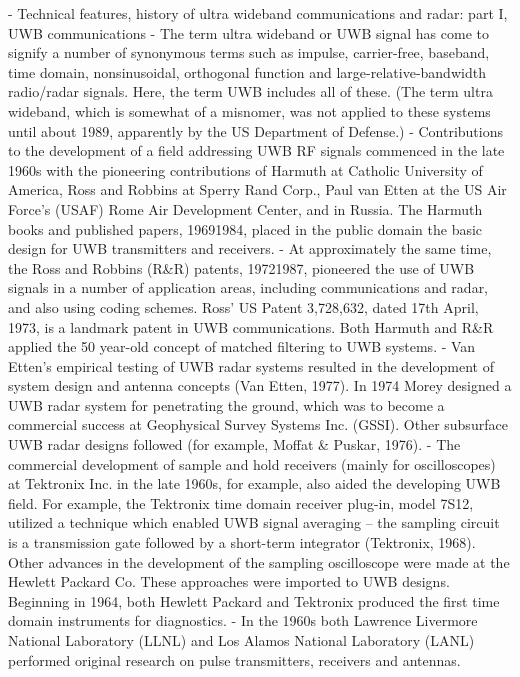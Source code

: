 \cite{barrett2001technical}
	- Technical features, history of ultra wideband communications and radar: part I, UWB communications
	- The term ultra wideband or UWB signal has come to signify a number of synonymous terms such as impulse, carrier-free, baseband, time domain, nonsinusoidal, orthogonal function and large-relative-bandwidth radio/radar signals. Here, the term UWB includes all of these. (The term ultra wideband, which is somewhat of a misnomer, was not applied to these systems until about 1989, apparently by the US Department of Defense.)
	- Contributions to the development of a field addressing UWB RF signals commenced in the late 1960s with the pioneering contributions of Harmuth at Catholic University of America, Ross and Robbins at Sperry Rand Corp., Paul van Etten at the US Air Force's (USAF) Rome Air Development Center, and in Russia. The Harmuth books and published papers, 19691984, placed in the public domain the basic design for UWB transmitters and receivers.
	- At approximately the same time, the Ross and Robbins (R\&R) patents, 19721987, pioneered the use of UWB signals in a number of application areas, including communications and radar, and also using coding schemes. Ross' US Patent 3,728,632, dated 17th April, 1973, is a landmark patent in UWB communications. Both Harmuth and R\&R applied the 50 year-old concept of matched filtering to UWB systems.
	- Van Etten's empirical testing of UWB radar systems resulted in the development of system design and antenna concepts (Van Etten, 1977). In 1974 Morey designed a UWB radar system for penetrating the ground, which was to become a commercial success at Geophysical Survey Systems Inc. (GSSI). Other subsurface UWB radar designs followed (for example, Moffat \& Puskar, 1976).
	- The commercial development of sample and hold receivers (mainly for oscilloscopes) at Tektronix Inc. in the late 1960s, for example, also aided the developing UWB field. For example, the Tektronix time domain receiver plug-in, model 7S12, utilized a technique which enabled UWB signal averaging -- the sampling circuit is a transmission gate followed by a short-term integrator (Tektronix, 1968). Other advances in the development of the sampling oscilloscope were made at the Hewlett Packard Co. These approaches were imported to UWB designs. Beginning in 1964, both Hewlett Packard and Tektronix produced the first time domain instruments for diagnostics.
	- In the 1960s both Lawrence Livermore National Laboratory (LLNL) and Los Alamos National Laboratory (LANL) performed original research on pulse transmitters, receivers and antennas.

